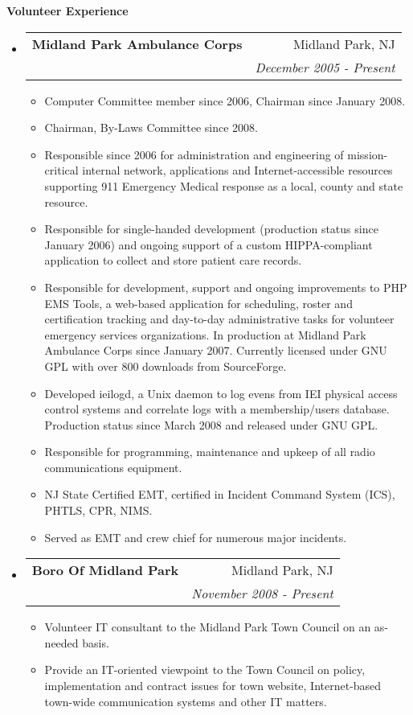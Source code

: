 \documentclass[letterpaper,11pt]{article}
\makeatletter
\newcommand{\resitem}[1]{\item #1 \vspace{-2pt}}
\newcommand{\resheading}[1]{{\large \colorbox{mygrey}{\begin{minipage}{\textwidth}{\textbf{#1 \vphantom{p\^{E}}}}\end{minipage}}}}
\newcommand{\ressubheading}[4]{
\begin{tabular*}{7.0in}{l@{\extracolsep{\fill}}r}
		\textbf{#1} & #2 \\
		\textit{#3} & \textit{#4} \\
\end{tabular*}\vspace{-6pt}}
\makeatother
\begin{document}
\resheading{Volunteer Experience}
\begin{itemize}
\item
        \ressubheading{Midland Park Ambulance Corps}{Midland Park, NJ}{ }{December 2005 - Present}
        \begin{itemize}
                \resitem{Computer Committee member since 2006, Chairman since
                  January 2008.}
                \resitem{Chairman, By-Laws Committee since 2008.}
                \resitem{Responsible since 2006 for administration and engineering of
                  mission-critical internal network, applications and
                  Internet-accessible resources supporting 911 Emergency
                  Medical response as a local, county and state resource.}
                \resitem{Responsible for single-handed development (production
                  status since January 2006) and ongoing support of a custom
                  HIPPA-compliant application to collect and store patient
                  care records.}
                \resitem{Responsible for development, support and ongoing
                  improvements to PHP EMS Tools, a web-based application for
                  scheduling, roster and certification tracking and day-to-day
                administrative tasks for volunteer emergency services
                organizations. In production at Midland Park Ambulance Corps
                since January 2007. Currently licensed under GNU GPL with over
                800 downloads from SourceForge.}
                \resitem{Developed ieilogd, a Unix daemon to log evens from
                  IEI physical access control systems and correlate logs with
                  a membership/users database. Production status since March
                  2008 and released under GNU GPL.}
                \resitem{Responsible for programming, maintenance and upkeep
                  of all radio communications equipment.}
                \resitem{NJ State Certified EMT, certified in Incident Command
                System (ICS), PHTLS, CPR, NIMS.}
                \resitem{Served as EMT and crew chief for numerous major
                  incidents.}
        \end{itemize}

\item
        \ressubheading{Boro Of Midland Park}{Midland Park, NJ}{}{November 2008 - Present}
        \begin{itemize}
                \resitem{Volunteer IT consultant to the Midland Park Town
                  Council on an as-needed basis.}
                \resitem{Provide an IT-oriented viewpoint to the Town Council on
                  policy, implementation and contract issues for town website,
                  Internet-based town-wide communication systems and other IT matters.}
        \end{itemize}
\end{itemize}
\end{document}
